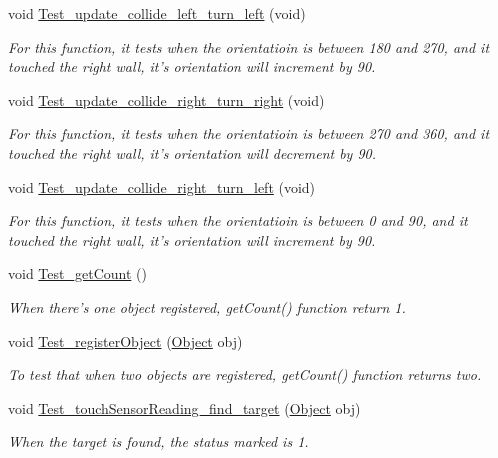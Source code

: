 \begin{DoxyCompactItemize}
void \hyperlink{classEnvironmentClassTest_a41ebe9e2605a503fe5865c2ecdbfd8e4}{Test\-\_\-update\-\_\-collide\-\_\-left\-\_\-turn\-\_\-left} (void)
\begin{DoxyCompactList}\small\item\em For this function, it tests when the orientatioin is between 180 and 270, and it touched the right wall, it's orientation will increment by 90. \end{DoxyCompactList}\item 
void \hyperlink{classEnvironmentClassTest_a27d199a25c9ba79cd8b58bdaf5e899ba}{Test\-\_\-update\-\_\-collide\-\_\-right\-\_\-turn\-\_\-right} (void)
\begin{DoxyCompactList}\small\item\em For this function, it tests when the orientatioin is between 270 and 360, and it touched the right wall, it's orientation will decrement by 90. \end{DoxyCompactList}\item 
void \hyperlink{classEnvironmentClassTest_ab276ec81cc77f81538ce49bb3234066a}{Test\-\_\-update\-\_\-collide\-\_\-right\-\_\-turn\-\_\-left} (void)
\begin{DoxyCompactList}\small\item\em For this function, it tests when the orientatioin is between 0 and 90, and it touched the right wall, it's orientation will increment by 90. \end{DoxyCompactList}\item 
void \hyperlink{classEnvironmentClassTest_a3f5427ee507cef27351aebccef508a3c}{Test\-\_\-get\-Count} ()
\begin{DoxyCompactList}\small\item\em When there's one object registered, get\-Count() function return 1. \end{DoxyCompactList}\item 
void \hyperlink{classEnvironmentClassTest_ad0f5791ae30997ba0264f5c8b29d67b0}{Test\-\_\-register\-Object} (\hyperlink{classObject}{Object} obj)
\begin{DoxyCompactList}\small\item\em To test that when two objects are registered, get\-Count() function returns two. \end{DoxyCompactList}\item 
void \hyperlink{classEnvironmentClassTest_aa56cb296aa9b61bf5fff62815fa320ea}{Test\-\_\-touch\-Sensor\-Reading\-\_\-find\-\_\-target} (\hyperlink{classObject}{Object} obj)
\begin{DoxyCompactList}\small\item\em When the target is found, the status marked is 1. \end{DoxyCompactList}\item 

\end{DoxyCompactItemize}
